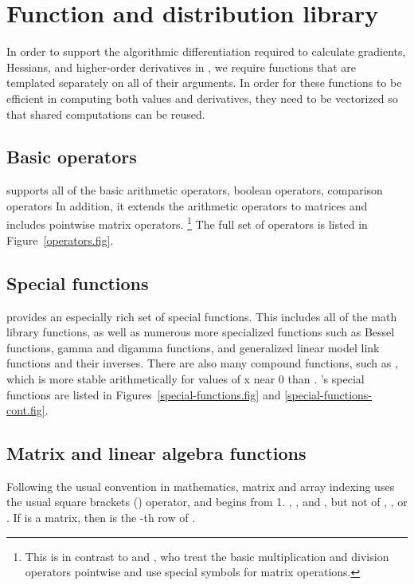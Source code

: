 \documentclass[article]{jss}
\begin{document}
\section{Function and distribution library}

In order to support the algorithmic differentiation required to
calculate gradients, Hessians, and higher-order derivatives in
, we require  functions that are 
templated separately on all of their arguments.  In order for these
functions to be efficient in computing both values and derivatives,
they need to be vectorized so that shared computations can be reused.

\subsection{Basic operators}

 supports all of the basic  arithmetic
operators, boolean operators, comparison operators  In addition, it
extends the arithmetic operators to matrices and includes pointwise
matrix operators.%
%
\footnote{This is in contrast to  and , who
  treat the basic multiplication and division operators pointwise and
  use special symbols for matrix operations.}
%
The full set of operators is listed in Figure~\ref{operators.fig}.

\subsection{Special functions}

 provides an especially rich set of special functions.
This includes all of the  math library functions, as
well as numerous more specialized functions such as Bessel functions,
gamma and digamma functions, and generalized linear model link
functions and their inverses.  There are also many compound functions,
such as , which is more stable arithmetically for
values of x near 0 than .  's special
functions are listed in Figures~\ref{special-functions.fig} and
\ref{special-functions-cont.fig}.


\subsection{Matrix and linear algebra functions}

Following the usual convention in mathematics, matrix and array
indexing uses the usual square brackets (\code{[ ]}) operator, and
begins from 1.  , , and ,
but not of , , or .
If  is a matrix, then  is the -th
row of .
\end{document}
